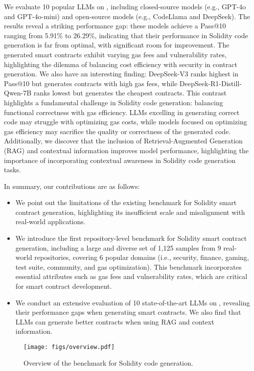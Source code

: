 We evaluate 10 popular LLMs on \mytitle, including closed-source models (e.g., GPT-4o and GPT-4o-mini) and open-source models (e.g., CodeLlama and DeepSeek).
The results reveal a striking performance gap: these models achieve a Pass@10 ranging from 5.91\% to 26.29\%, indicating that their performance in Solidity code generation is far from optimal, with significant room for improvement. The generated smart contracts exhibit varying gas fees and vulnerability rates, highlighting the dilemma of balancing cost efficiency with security in contract generation. We also have an interesting finding: DeepSeek-V3 ranks highest in Pass@10 but generates contracts with high gas fees, while DeepSeek-R1-Distill-Qwen-7B ranks lowest but generates the cheapest contracts. This contrast highlights a fundamental challenge in Solidity code generation: balancing functional correctness with gas efficiency. LLMs excelling in generating correct code may struggle with optimizing gas costs, while models focused on optimizing gas efficiency may sacrifice the quality or correctness of the generated code. Additionally, we discover that the inclusion of Retrieval-Augmented Generation (RAG) and contextual information improves model performance, highlighting the importance of incorporating contextual awareness in Solidity code generation tasks.


In summary, our contributions are as follows:


\begin{itemize}[leftmargin=*]
    \item We point out the limitations of the existing benchmark for Solidity smart contract generation, highlighting its insufficient scale and misalignment with real-world applications. 
    \item We introduce the first repository-level benchmark for Solidity smart contract generation, including a large and diverse set of 1,125 samples from 9 real-world repositories, covering 6 popular domains (i.e., security, finance, gaming, test suite, community, and gas optimization).
    This benchmark incorporates essential attributes such as gas fees and vulnerability rates, which are critical for smart contract development.
    \item We conduct an extensive evaluation of 10 state-of-the-art LLMs on \mytitle, revealing their performance gaps when generating smart contracts. We also find that LLMs can generate better contracts when using RAG and context information.
\end{itemize}


\begin{figure*}[htbp!]
    \centering
    \texttt{[image: figs/overview.pdf]}
    \caption{Overview of the \datasetname benchmark for Solidity code generation.}
    \label{fig:overview}
\end{figure*}
